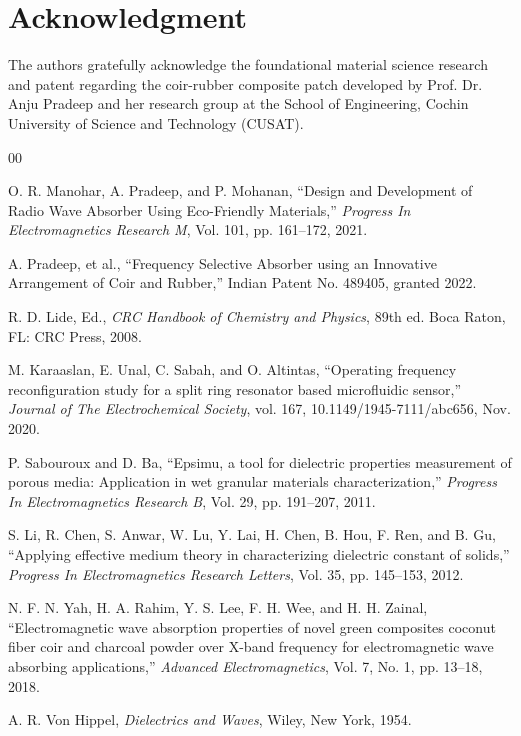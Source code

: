 \documentclass[11pt, a4paper]{article}
\begin{document}
\vspace*{10pt}
\section*{Acknowledgment}
The authors gratefully acknowledge the foundational material science research and patent regarding the coir-rubber composite patch developed by Prof. Dr. Anju Pradeep and her research group at the School of Engineering, Cochin University of Science and Technology (CUSAT).

\newpage
\begin{thebibliography}{00}

 O. R. Manohar, A. Pradeep, and P. Mohanan, ``Design and Development of Radio Wave Absorber Using Eco-Friendly Materials,'' \textit{Progress In Electromagnetics Research M}, Vol. 101, pp. 161--172, 2021.

 A. Pradeep, et al., ``Frequency Selective Absorber using an Innovative Arrangement of Coir and Rubber,'' Indian Patent No. 489405, granted 2022.

 R. D. Lide, Ed., \textit{CRC Handbook of Chemistry and Physics}, 89th ed. Boca Raton, FL: CRC Press, 2008.

 M. Karaaslan, E. Unal, C. Sabah, and O. Altintas, ``Operating frequency reconfiguration study for a split ring resonator based microfluidic sensor,'' \textit{Journal of The Electrochemical Society}, vol. 167, 10.1149/1945-7111/abc656, Nov. 2020.

 P. Sabouroux and D. Ba, ``Epsimu, a tool for dielectric properties measurement of porous media: Application in wet granular materials characterization,'' \textit{Progress In Electromagnetics Research B}, Vol. 29, pp. 191--207, 2011.

 S. Li, R. Chen, S. Anwar, W. Lu, Y. Lai, H. Chen, B. Hou, F. Ren, and B. Gu, ``Applying effective medium theory in characterizing dielectric constant of solids,'' \textit{Progress In Electromagnetics Research Letters}, Vol. 35, pp. 145--153, 2012.

 N. F. N. Yah, H. A. Rahim, Y. S. Lee, F. H. Wee, and H. H. Zainal, ``Electromagnetic wave absorption properties of novel green composites coconut fiber coir and charcoal powder over X-band frequency for electromagnetic wave absorbing applications,'' \textit{Advanced Electromagnetics}, Vol. 7, No. 1, pp. 13--18, 2018.

 A. R. Von Hippel, \textit{Dielectrics and Waves}, Wiley, New York, 1954.

\end{thebibliography}
\end{document}
